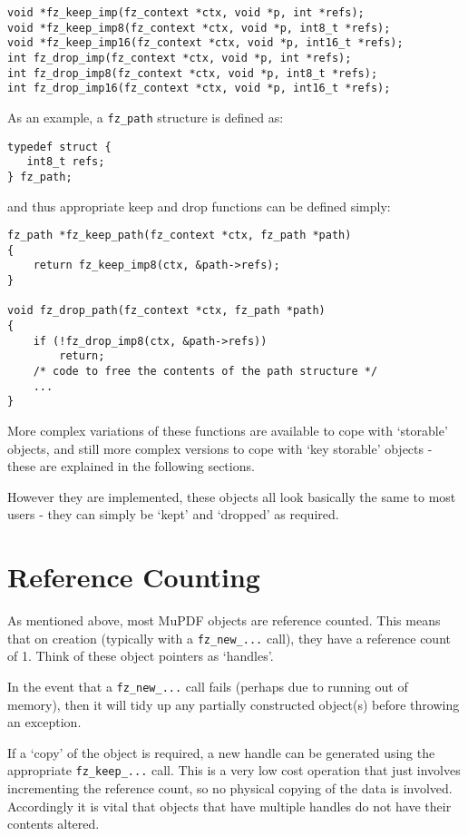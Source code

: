 \documentclass[oneside]{book}
\begin{document}
\begin{lstlisting}
void *fz_keep_imp(fz_context *ctx, void *p, int *refs);
void *fz_keep_imp8(fz_context *ctx, void *p, int8_t *refs);
void *fz_keep_imp16(fz_context *ctx, void *p, int16_t *refs);
int fz_drop_imp(fz_context *ctx, void *p, int *refs);
int fz_drop_imp8(fz_context *ctx, void *p, int8_t *refs);
int fz_drop_imp16(fz_context *ctx, void *p, int16_t *refs);
\end{lstlisting}

As an example, a \texttt{fz\_path} structure is defined as:

\begin{lstlisting}
typedef struct {
   int8_t refs;
} fz_path;
\end{lstlisting}

and thus appropriate keep and drop functions can be defined simply:

\begin{lstlisting}
fz_path *fz_keep_path(fz_context *ctx, fz_path *path)
{
	return fz_keep_imp8(ctx, &path->refs);
}

void fz_drop_path(fz_context *ctx, fz_path *path)
{
	if (!fz_drop_imp8(ctx, &path->refs))
		return;
	/* code to free the contents of the path structure */
	...
}
\end{lstlisting}

More complex variations of these functions are available to cope with `storable' objects, and still more complex versions to cope with `key storable' objects - these are explained in the following sections.

However they are implemented, these objects all look basically the same to most users - they can simply be `kept' and `dropped' as required.

\section{Reference Counting}
\label{ReferenceCounting}

As mentioned above, most MuPDF objects are reference counted. This means that on  creation (typically with a \texttt{fz\_new\_...} call), they have a reference count of 1. Think of these object pointers as `handles'.

In the event that a \texttt{fz\_new\_...} call fails (perhaps due to running out of memory), then it will tidy up any partially constructed object(s) before throwing an exception.

If a `copy' of the object is required, a new handle can be generated using the appropriate \texttt{fz\_keep\_...} call. This is a very low cost operation that just involves incrementing the reference count, so no physical copying of the data is involved. Accordingly it is vital that objects that have multiple handles do not have their contents altered.
\end{document}
